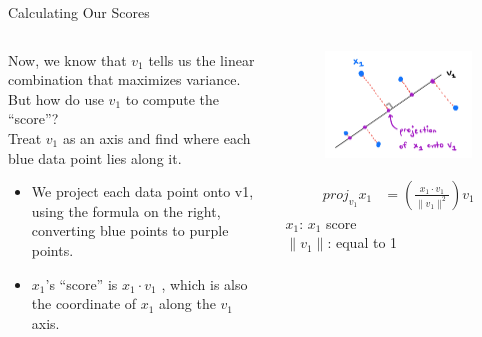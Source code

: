 \documentclass[aspectratio=169]{../latex_main/tntbeamer}  %
\begin{document}
	
	
	\begin{frame}{Calculating Our Scores}
	    \begin{columns}
	        \begin{column}{.5\textwidth}
	               Now, we know that $v_1$ tells us the linear combination that maximizes variance. But how do use $v_1$ to compute the “score”?\\
	               \bigskip
	               Treat $v_1$ as an axis and find where each blue data point lies along it.
	               \begin{itemize}
	                   \item We project each data point onto v1, using the formula on the right, converting blue points to purple points.
	                   \item $x_1$’s “score” is	$x_1\cdot v_1$		, which is also the coordinate of $x_1$ along the $v_1$ axis.
	               \end{itemize}


	        \end{column}
	        
	        
	        \begin{column}{.5\textwidth}
	                \begin{figure}
	                    \centering
	                    \includegraphics[scale=.4]{Bild9}
	                \end{figure}
	                \begin{align*}
	                    proj_{v_1} x_1 &= \left(\frac{x_1\cdot v_1}{\| v_1 \| ^2}\right)v_1
	                \end{align*}
	                $x_1$: $x_1$ score\\
	                $\| v_1 \|$: equal to 1
	        \end{column}
	    \end{columns}
	\end{frame}
	
\end{document}
